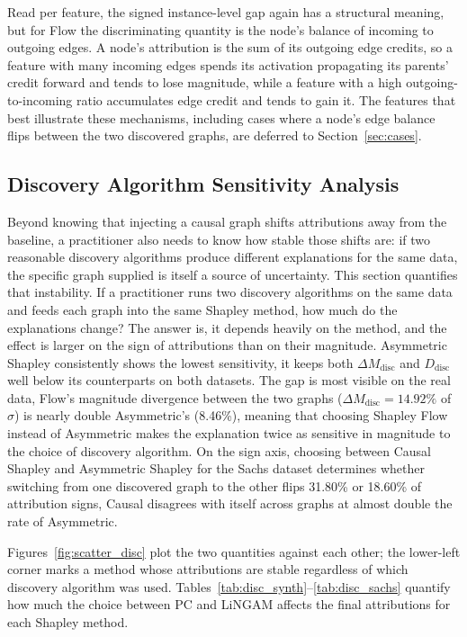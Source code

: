 \documentclass[12pt,a4paper,oneside]{article}
\begin{document}
Read per feature, the signed instance-level gap again has a structural meaning, but for Flow the discriminating quantity is the node's balance of incoming to outgoing edges. A node's attribution is the sum of its outgoing edge credits, so a feature with many incoming edges spends its activation propagating its parents' credit forward and tends to lose magnitude, while a feature with a high outgoing-to-incoming ratio accumulates edge credit and tends to gain it. The features that best illustrate these mechanisms, including cases where a node's edge balance flips between the two discovered graphs, are deferred to Section~\ref{sec:cases}.

\subsection{Discovery Algorithm Sensitivity Analysis}
\label{sec:disc_analysis}

Beyond knowing that injecting a causal graph shifts attributions away from the baseline, a practitioner also needs to know how stable those shifts are: if two reasonable discovery algorithms produce different explanations for the same data, the specific graph supplied is itself a source of uncertainty. This section quantifies that instability. If a practitioner runs two discovery algorithms on the same data and feeds each graph into the same Shapley method, how much do the explanations change? The answer is, it depends heavily on the method, and the effect is larger on the sign of attributions than on their magnitude. Asymmetric Shapley consistently shows the lowest sensitivity, it keeps both $\Delta M_{\text{disc}}$ and $D_{\text{disc}}$ well below its counterparts on both datasets. The gap is most visible on the real data, Flow's magnitude divergence between the two graphs ($\Delta M_{\text{disc}} = 14.92\%$ of $\hat{\sigma}$) is nearly double Asymmetric's (8.46\%), meaning that choosing Shapley Flow instead of Asymmetric makes the explanation twice as sensitive in magnitude to the choice of discovery algorithm. On the sign axis, choosing between Causal Shapley and Asymmetric Shapley for the Sachs dataset determines whether switching from one discovered graph to the other flips 31.80\% or 18.60\% of attribution signs, Causal disagrees with itself across graphs at almost double the rate of Asymmetric.

Figures~\ref{fig:scatter_disc} plot the two quantities against each other; the lower-left corner marks a method whose attributions are stable regardless of which discovery algorithm was used. Tables~\ref{tab:disc_synth}--\ref{tab:disc_sachs} quantify how much the choice between PC and LiNGAM affects the final attributions for each Shapley method.
\end{document}
